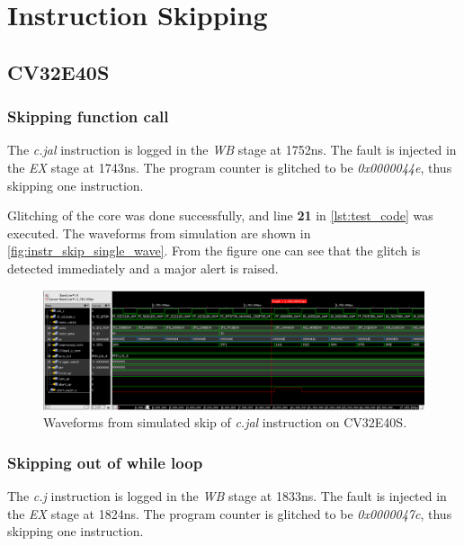 \section{Instruction Skipping}
\label{sec:instr_skip_result}

\subsection{CV32E40S}
\label{subsec:single_instr_skip}

\subsubsection{Skipping function call}
\label{subsubsec:func_call}

The \textit{c.jal} instruction is logged in the \textit{WB} stage at 1752ns. The fault is injected in the \textit{EX} stage at 1743ns. The program counter is glitched to be \textit{0x0000044e}, thus skipping one instruction. 

Glitching of the core was done successfully, and line \textbf{21} in \autoref{lst:test_code} was executed. The waveforms from simulation are shown in \autoref{fig:instr_skip_single_wave}. From the figure one can see that the glitch is detected immediately and a major alert is raised. 

\begin{figure}[h!]
    \centering
    \includegraphics[width=\textwidth]{docs/images/instr_skip_glitch_injection_single_core.png}
    \caption{Waveforms from simulated skip of \textit{c.jal} instruction on CV32E40S.}
    \label{fig:instr_skip_single_wave}
\end{figure}

\subsubsection{Skipping out of while loop}

The \textit{c.j} instruction is logged in the \textit{WB} stage at 1833ns. The fault is injected in the \textit{EX} stage at 1824ns. The program counter is glitched to be \textit{0x0000047c}, thus skipping one instruction.

